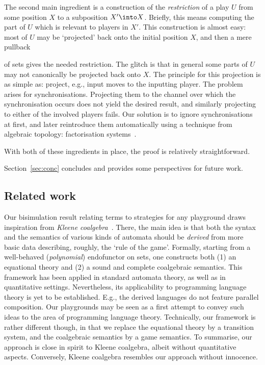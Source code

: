 \documentclass{LMCS}
\theoremstyle{plain}\newtheorem{satz}[thm]{Satz}
\begin{document}
The second main ingredient is a construction of the \emph{restriction}
of a play $U$ from some position $X$ to a subposition $X' \into X$.
Briefly, this means computing the part of $U$ which is relevant to
players in $X'$. This construction is almost easy: most of $U$ may be
`projected' back onto the initial position $X$, and then a mere
pullback
\begin{center}
\end{center}
of sets gives the needed restriction. The glitch is that in general
some parts of $U$ may not canonically be projected back onto $X$. The
principle for this projection is as simple as: project, e.g., input
moves to the inputting player. The problem arises for
synchronisations. Projecting them to the channel over which the
synchronisation occurs does not yield the desired result, and
similarly projecting to either of the involved players fails.  Our
solution is to ignore synchronisations at first, and later reintroduce
them automatically using a technique from algebraic
topology: factorisation systems~\cite{Joyal:ncatlab:facto}.

With both of these ingredients in place, the proof is relatively
straightforward.

Section~\ref{sec:conc} concludes and provides some perspectives for
future work.

\subsection{Related work}
Our bisimulation result relating terms to strategies for any
playground draws inspiration from \emph{Kleene
  coalgebra}~\cite{DBLP:conf/fossacs/BonsangueRS09,DBLP:conf/concur/BonchiBRS09}. There,
the main idea is that both the syntax and the semantics of various
kinds of automata should be \emph{derived} from more basic data
describing, roughly, the `rule of the game'. Formally, starting from a
well-behaved (\emph{polynomial}) endofunctor on sets, one constructs
both (1) an equational theory and (2) a sound and complete coalgebraic
semantics. This framework has been applied in standard automata
theory, as well as in quantitative settings.  Nevertheless, its
applicability to programming language theory is yet to be
established. E.g., the derived languages do not feature parallel
composition.  Our playgrounds may be seen as a first attempt to convey
such ideas to the area of programming language theory.  Technically,
our framework is rather different though, in that we replace the
equational theory by a transition system, and the coalgebraic
semantics by a game semantics.  To summarise, our approach is close in
spirit to Kleene coalgebra, albeit without quantitative
aspects. Conversely, Kleene coalgebra resembles our approach without
innocence.
\end{document}
